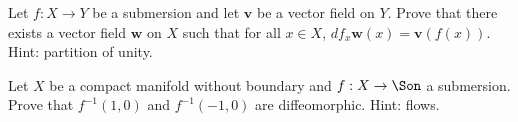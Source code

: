 \begin{alist}
\item Let $f:X\rightarrow Y$ be a submersion and let $\mathbf{v}$ be a
vector field on $Y$. Prove that there exists a vector field
$\mathbf{w}$ on $X$ such that for all $x\in X$,
$df_x\mathbf{w}(x)=\mathbf{v}(f(x))$. Hint: partition of unity.
\item Let $X$ be a compact manifold without boundary and
$f:X\rightarrow \Son$ a submersion. Prove that $f^{-1}(1,0)$ and
$f^{-1}(-1,0)$ are diffeomorphic. Hint: flows.
\end{alist}
